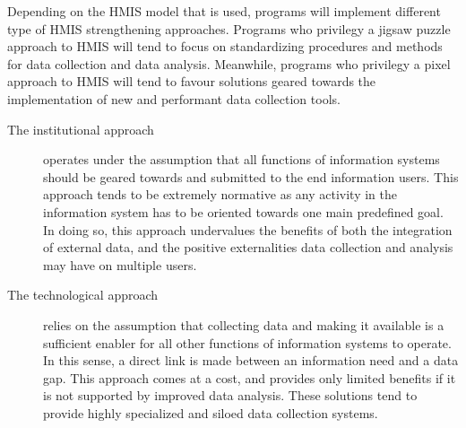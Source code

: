 Depending on the HMIS model that is used, programs will implement different type of HMIS strengthening approaches. Programs who privilegy a jigsaw puzzle approach to HMIS will tend to focus on standardizing procedures and methods for data collection and data analysis. Meanwhile, programs who privilegy a pixel approach to HMIS will tend to favour solutions geared towards the implementation of new and performant data collection tools.

\begin{description}
\item[The institutional approach] operates under the assumption that all functions of information systems should be geared towards and submitted to the end information users. This approach tends to be extremely normative as any activity in the information system has to be oriented towards one main predefined goal. In doing so, this approach undervalues the benefits of both the integration of external data, and the positive externalities data collection and analysis may have on multiple users.



\item[The technological approach] relies on the assumption that collecting data and making it available is a sufficient enabler for all other functions of information systems to operate. In this sense, a direct link is made between an information need and a data gap. This approach comes at a cost, and provides only limited benefits if it is not supported by improved data analysis. These solutions tend to provide highly specialized and siloed data collection systems.

\end{description}

